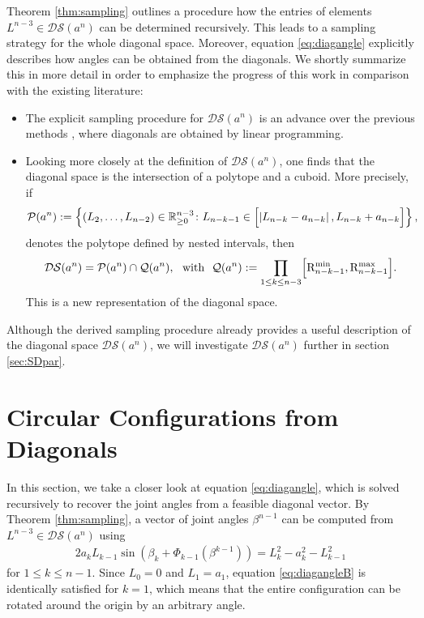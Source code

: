 \documentclass[10pt,a4paper]{article}
\theoremstyle{definition}
\theoremstyle{remark}
\numberwithin{equation}{section}
\newcommand{\Pol}{\mathcal{P}}
\newcommand{\Q}{\mathcal{Q}}
\begin{document}
Theorem  \ref{thm:sampling} outlines a procedure how the entries of elements $L^{n-3} \in \mathcal{DS}(a^n)$ can be determined recursively. This leads to a sampling strategy for the whole diagonal space. Moreover, equation \eqref{eq:diagangle} explicitly describes how angles can be obtained from  the diagonals. We shortly summarize this in more detail in order to emphasize the progress of this work in comparison with the existing literature: 
\begin{itemize}
\item The explicit sampling procedure for $\mathcal{DS}(a^n)$ is an advance over the previous methods  \cite{han2006inverse,han2008conv}, where diagonals are obtained by linear programming. 
\item Looking more closely at the definition of $\mathcal{DS}(a^n)$, one finds that the diagonal space is the intersection of a polytope and a cuboid.  More precisely, if 
\begin{align}\label{eq:Pol}
\Pol(a^n):=\left\{(L_2,\dotsc,L_{n-2})\in \mathbb{R}^{n-3}_{\geq 0}   \colon L_{n-k-1} \in   \Bigl[\left|L_{n-k}-a_{n-k}\right|,L_{n-k}+a_{n-k}\Bigr]\right\},
\end{align}
denotes the polytope defined by nested intervals, then
\begin{align}\label{eq:Cub}
 \mathcal{DS}(a^n) = \Pol(a^n) \cap \Q(a^n), ~~\text{with}~~ \Q(a^n) :=  \prod_{1\leq k \leq n-3} \Bigl[ \mathrm{ R}_{n-k-1}^{\min}, \mathrm{  R}_{n-k-1}^{\max}\Bigr].
\end{align}
This is a new representation of the diagonal space. 
\end{itemize}
Although the derived sampling procedure already provides a useful description of the diagonal space $\mathcal{DS}(a^n)$,  we will investigate $\mathcal{DS}(a^n)$ further in  section \ref{sec:SDpar}. 


\section{Circular Configurations from Diagonals}\label{sec:diagspace}

In this section, we take a closer look at equation \eqref{eq:diagangle}, which is solved recursively to recover the joint angles from a feasible diagonal vector. By Theorem \ref{thm:sampling}, a vector of joint angles $\beta^{n-1}$ can be computed from $L^{n-3}\in\mathcal{DS}(a^n)$ using
\begin{align}\label{eq:diagangleB}
2 a_k L_{k-1}  \sin\left( \beta_k + \Phi_{k-1}\left( \beta^{k-1}\right)  \right) =  L_k^2  - a_k^2 - L_{k-1}^2 
\end{align}
for $1\leq k\leq n-1$. Since $L_0=0$ and $L_1=a_1$, equation \eqref{eq:diagangleB} is identically satisfied for $k=1$, which means that the entire configuration can be rotated  around the origin by an arbitrary angle.
\end{document}

